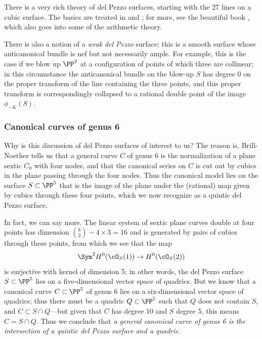 There is a very rich theory of del Pezzo surfaces, starting with the 27 lines on a cubic surface. The basics are treated in \cite{Beauville} and \cite{Griffiths-Harris}; for more, see the
beautiful book \cite{Manin}, which also goes into some of the arithmetic theory.

There is also a notion of a \emph{weak del Pezzo} surface; this is a smooth surface whose anticanonical bundle is nef but not necessarily ample. For example, this is the case if we blow up $\PP^2$ at a configuration of points of which three are collinear; in this circumstance the anticanonical bundle on the blow-up $S$ has degree 0 on the proper transform of the line containing the three points, and this proper transform is correspondingly collapsed to a rational double point of the image $\phi_{-K}(S)$. 

\subsubsection{Canonical curves of genus 6}

Why is this discussion of del Pezzo surfaces of interest to us? The reason is, Brill-Noether tells us that a general curve $C$ of genus 6 is the normalization of a plane sextic $C_0$ with four nodes, and that the canonical series on $C$ is cut out by cubics in the plane passing through the four nodes. Thus the canonical model lies on the surface $S \subset \PP^5$ that is the image of the plane under the (rational) map given by cubics through these four points, which we now recognize as a quintic del Pezzo surface.

In fact, we can say more. The linear system of sextic plane curves double at four points has dimension $\binom{8}{2} - 4\times 3 = 16$ and is generated by pairs of cubics through these points, from which we see that the map
$$
\Sym^2 H^0(\cO_S(1)) \to H^0(\cO_S(2))
$$
is surjective with kernel of dimension 5; in other words, the del Pezzo surface $S \subset \PP^5$ lies on a five-dimensional vector space of quadrics. But we know that a canonical curve $C \subset \PP^5$ of genus 6 lies on a six-dimensional vector space of quadrics; thus there must be a quadric $Q \subset \PP^5$ such that $Q$ does not contain $S$, and $C \subset S \cap Q$---but given that $C$ has degree 10 and $S$ degree 5, this means $C = S \cap Q$. Thus we conclude that \emph{a general canonical curve of genus 6 is the intersection of a quintic del Pezzo surface and a quadric}.


